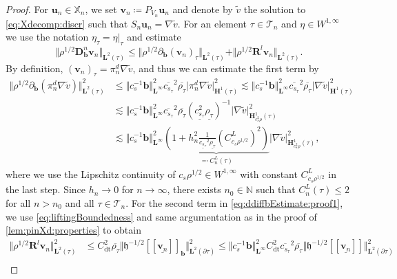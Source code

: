 \documentclass{m2an}
\newcommand{\bflow}{\mathbf{b}}
\renewcommand{\u}{\mathbf{u}}
\renewcommand{\v}{\mathbf{v}}
\newcommand{\calT}{\mathcal{T}}
\newcommand{\Xn}{\mathbb{X}_n}
\newcommand{\bH}{{\mathbf H}}
\newcommand{\bD}{\mathbf{D}}
\newcommand{\bRl}{\mathbf{R}^{\!l}}
\newcommand{\bL}{\mathbf{L}}
\newcommand{\hdgjump}[1]{[\![\underline{#1} ]\!]}
\newcommand{\Tn}{\calT_n}
\newcommand{\N}{\mathbb{N}}
\newcommand{\diffb}{\partial_{\bflow}}
\newcommand{\ddiffb}{\bD_{\bflow}^n}
\newcommand{\PVol}[1]{(#1)_{\tau}}
\newcommand{\h}{\mathfrak{h}}
\newcommand{\Sol}{S_n}
\theoremstyle{plain}
\theoremstyle{definition}
\begin{document}
\begin{proof}
   For $\u_n \in \Xn$, we set $\v_n \coloneqq P_{V_n} \u_n$ and denote by $\tilde{v}$ the solution to \eqref{eq:Xdecomp:discr} such that $\Sol \u_n = \nabla \tilde{v}$. For an element $\tau \in \Tn$ and $\eta \in W^{1,\infty}$ we use the notation $\eta_{\tau} = \eta \vert_{\tau}$ and estimate
   \begin{equation}\label{eq:ddiffbEstimate:proof1}
      \Vert \rho^{1/2} \ddiffb \v_n \Vert_{\bL^2(\tau)} \le \Vert \rho^{1/2} \diffb \PVol{\v_n} \Vert_{\bL^2(\tau)} + \Vert \rho^{1/2} \bRl \v_n \Vert_{\bL^2(\tau)}.
   \end{equation}
   By definition, $\PVol{\v_n} = \pi_n^d \nabla \tilde{v}$, and thus we can estimate the first term by  
   \begin{align*}
      \Vert \rho^{1/2} \diffb (\pi_n^d \nabla \tilde{v}) \Vert^2_{\bL^2(\tau)} &\le \Vert c_s^{-1} \bflow \Vert^2_{\bL^\infty} \overline{c_{s_\tau}}^2 \overline{\rho_{\tau}} \vert \pi_n^d \nabla \tilde{v} \vert^2_{\bH^1(\tau)} \lesssim \Vert c_s^{-1} \bflow \Vert^2_{\bL^\infty} \overline{c_{s_\tau}}^2 \overline{\rho_{\tau}} \vert \nabla \tilde{v} \vert^2_{\bH^1(\tau)} \\
  &\lesssim \Vert c_s^{-1} \bflow \Vert^2_{\bL^\infty} \overline{c_{s_\tau}}^2 \overline{\rho_{\tau}}   (\underline{c^2_{s_{\tau}}} \underline{\rho_{\tau}})^{-1} \vert \nabla \tilde{v} \vert^2_{\bH^1_{c_s^2 \rho}(\tau)}\\
  &\lesssim \Vert c_s^{-1} \bflow \Vert^2_{\bL^\infty}  \!\! \underbrace{\left( 1 + h_n^2 \frac{1}{\underline{c_{s_\tau}}^2 \underline{\rho_{\tau}}} (C^L_{c_s \rho^{1/2}})^2 \right)}_{\eqqcolon C_n^L(\tau)}\! \vert \nabla \tilde{v} \vert^2_{\bH^1_{c_s^2 \rho}(\tau)}\!\!, 
   \end{align*}
   where we use the Lipschitz continuity of $c_s \rho^{1/2} \in W^{1,\infty}$ with constant $C^L_{c_s \rho^{1/2}}$ in the last step. Since $h_n \to 0$ for $n \to \infty$, there exists $n_0 \in \N$ such that $C_n^L(\tau) \le 2$ for all $n > n_0$ and all $\tau \in \Tn$. 
   For the second term in \eqref{eq:ddiffbEstimate:proof1}, we use \eqref{eq:liftingBoundedness} and same argumentation as in the proof of \cref{lem:pinXd:properties} to obtain
   \begin{align*}
      \Vert \rho^{1/2} \bRl \v_n \Vert^2_{\bL^2(\tau)} &\le C_{\text{dt}}^2 \overline{\rho_{\tau}} \Vert \h^{-1/2} \hdgjump{\v_n}_{\bflow} \Vert^2_{\bL^2(\partial \tau)} \le \Vert c_s^{-1} \bflow \Vert^2_{\bL^\infty} C_{\text{dt}}^2 \overline{c_{s_\tau}}^2 \overline{\rho_{\tau}} \Vert \h^{-1/2} \hdgjump{\v_n} \Vert^2_{\bL^2(\partial \tau)} \\

\end{align*}
\end{proof}
\end{document}
